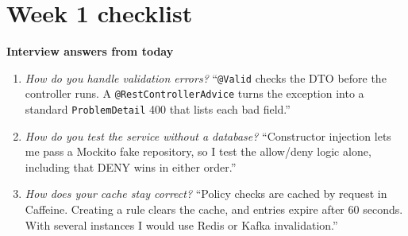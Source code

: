 \documentclass[11pt,a4paper]{article}
\newcommand{\code}[1]{\texttt{\small #1}}
\begin{document}
\section{Week 1 checklist}

\begin{center}
\end{center}

\textbf{Interview answers from today}
\begin{enumerate}
  \item \emph{How do you handle validation errors?} ``\code{@Valid} checks the DTO before the controller runs. A \code{@RestControllerAdvice} turns the exception into a standard \code{ProblemDetail} 400 that lists each bad field.''
  \item \emph{How do you test the service without a database?} ``Constructor injection lets me pass a Mockito fake repository, so I test the allow/deny logic alone, including that DENY wins in either order.''
  \item \emph{How does your cache stay correct?} ``Policy checks are cached by request in Caffeine. Creating a rule clears the cache, and entries expire after 60 seconds. With several instances I would use Redis or Kafka invalidation.''
\end{enumerate}
\end{document}
